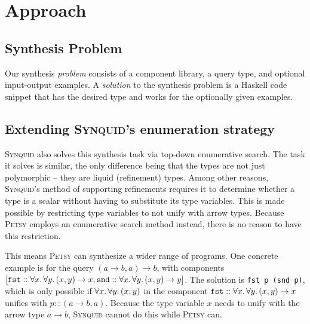 \documentclass[acmsmall,nonacm]{acmart}
\begin{document}
\section{Approach}
\label{approach}



\subsection{Synthesis Problem}

Our synthesis \textit{problem} consists of a component library, a query type,
and optional input-output examples. A \textit{solution} to the synthesis 
problem is a Haskell code snippet that has the desired type and works 
for the optionally given examples.

\subsection{Extending \textsc{Synquid}'s enumeration strategy} 


\textsc{Synquid} also solves this synthesis task via top-down enumerative search.
The task it solves is similar, the only difference being that the types are
not just polymorphic -- they are liquid (refinement) types. Among other
reasons, \textsc{Synquid}'s method of supporting refinements requires it to
determine whether a type is a scalar without having to substitute its type
variables. This is made possible by restricting type variables to not unify
with arrow types. Because \textsc{Petsy} employs an enumerative search method
instead, there is no reason to have this restriction.

This means \textsc{Petsy} can synthesize a wider range of programs. One
concrete example is for the query $(a \to b, a) \to b$, with components
$[\texttt{fst} :: \forall x\ldotp\forall y\ldotp (x,y)\to x, \texttt{snd} ::
\forall x\ldotp\forall y\ldotp (x,y)\to y]$. The solution is \texttt{fst p
(snd p)}, which is only possible if $\forall x\ldotp\forall y\ldotp (x,y)$ in
the component $\texttt{fst} :: \forall x\ldotp\forall y\ldotp (x,y)\to x$
unifies with $p :: (a \to b, a)$. Because the type variable $x$ needs to unify
with the arrow type $a \to b$, \textsc{Synquid} cannot do this while
\textsc{Petsy} can.
\end{document}
